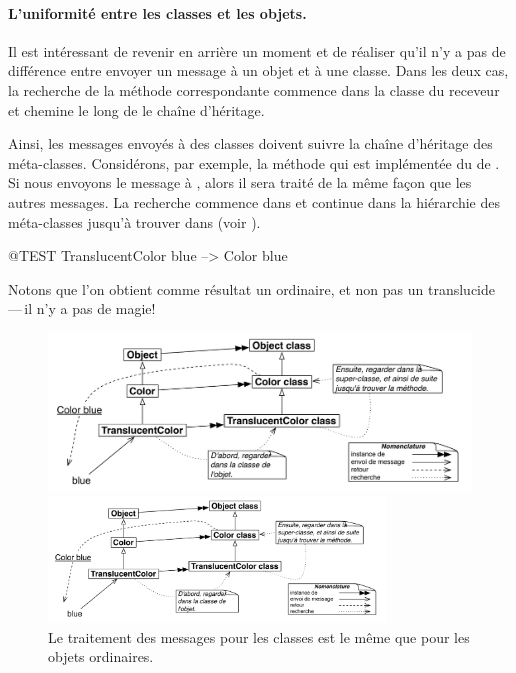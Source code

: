 \documentclass[a4paper,10pt,twoside]{book}
\begin{document}
\paragraph{L'uniformité entre les classes et les objets.}
Il est intéressant de revenir en arrière un moment et de réaliser qu'il n'y a pas de différence entre envoyer un message à un objet et à une classe.
Dans les deux cas, la recherche de la méthode correspondante commence dans la classe du receveur et chemine le long de le chaîne d'héritage.

Ainsi, les messages envoyés à des classes doivent suivre la chaîne d'héritage des méta-classes. 
Considérons, par exemple, la méthode  qui est implémentée du  de .
Si nous envoyons le message  à , alors il sera traité de la même façon que les autres messages.
La recherche commence dans  et continue dans la hiérarchie des méta-classes jusqu'à trouver dans   (voir ).

\begin{code}{@TEST}
TranslucentColor blue --> Color blue
\end{code}
\noindent
Notons que l'on obtient comme résultat un   ordinaire, et non pas un translucide\,---\,il n'y a pas de magie!

\begin{center}
\begin{figure}[!ht]
\ifluluelse
	{\centerline {\includegraphics[width=\textwidth]{TranslucentColorBlue}}}
	{\centerline {\includegraphics[width=0.8\textwidth]{TranslucentColorBlue}}}
\caption{Le traitement des messages pour les classes est le même que pour les objets ordinaires.}
\end{figure}
\end{center}
\end{document}
